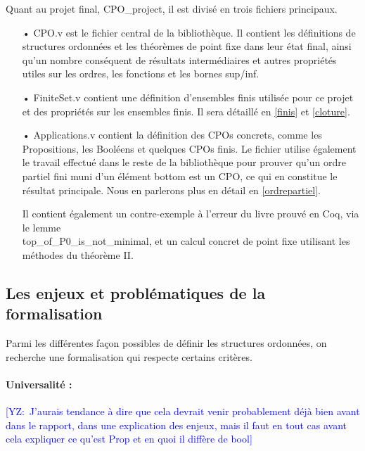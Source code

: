 \documentclass{article}
\newcommand{\yz}[1]{\textcolor{blue}{{[YZ:~#1]}}}
\newcommand\code[1]{{\fontfamily{lmtt}\selectfont #1}}
\theoremstyle{definition}
\begin{document}
Quant au projet final, \code{CPO\_project}, il est divisé en trois fichiers principaux.

\medskip


\begin{itemize}
\item[•] \code{CPO.v} est le fichier central de la bibliothèque. Il contient les définitions de structures ordonnées et les théorèmes de point fixe dans leur état final, ainsi qu'un nombre conséquent de résultats intermédiaires et autres propriétés utiles sur les ordres, les fonctions et les bornes sup/inf.
\item[•] \code{FiniteSet.v} contient une définition d'ensembles finis utilisée pour ce projet et des propriétés sur les ensembles finis. Il sera détaillé en \ref{finis} et \ref{cloture}.
\item[•] \code{Applications.v} contient la définition des CPOs concrets, comme les Propositions, les Booléens et quelques CPOs finis. Le fichier utilise également le travail effectué dans le reste de la bibliothèque pour prouver qu'un ordre partiel fini muni d'un élément bottom est un CPO, ce qui en constitue le résultat principale. Nous en parlerons plus en détail en \ref{ordrepartiel}.

Il contient également un contre-exemple à l'erreur du livre prouvé en Coq, via le lemme \\ \code{top\_of\_P0\_is\_not\_minimal}, et un calcul concret de point fixe utilisant les méthodes du théorème II.
\end{itemize}




\subsection{Les enjeux et problématiques de la formalisation}

Parmi les différentes façon possibles de définir les structures ordonnées, on recherche une formalisation qui respecte certains critères.

\paragraph{Universalité :\\}
\label{universalite}
\yz{J'aurais tendance à dire que cela devrait venir probablement déjà bien avant
dans le rapport, dans une explication des enjeux, mais il faut en tout cas avant
cela expliquer ce qu'est Prop et en quoi il diffère de bool}
\end{document}
